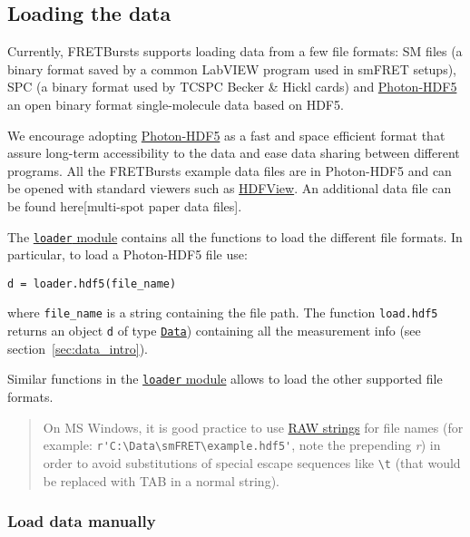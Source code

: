 \subsection{Loading the data}
Currently, FRETBursts supports loading data from a few file formats: SM files (a binary format saved by a common LabVIEW program used in smFRET setups), SPC (a binary format used by TCSPC Becker \& Hickl cards) and \href{http://photon-hdf5.readthedocs.org/}{Photon-HDF5}  an open binary format single-molecule data based on HDF5.

We encourage adopting \href{http://photon-hdf5.readthedocs.org/}{Photon-HDF5} as a fast and space efficient format that assure long-term accessibility to the data and ease data sharing between different programs. All the FRETBursts example data files are in Photon-HDF5 and can be opened with standard viewers such as \href{http://www.hdfgroup.org/products/java/hdfview/}{HDFView}. An additional data file can be found here[multi-spot paper data files].

The \href{http://fretbursts.readthedocs.org/en/latest/loader.html}{\texttt{loader} module}
contains all the functions to load the different file formats. In particular, to load a Photon-HDF5 file use:

\begin{verbatim}
d = loader.hdf5(file_name)
\end{verbatim}

where \verb|file_name| is a string containing the file path. The function \verb|load.hdf5| returns an object \verb|d| of type \href{http://fretbursts.readthedocs.org/en/latest/data_class.html}{\texttt{Data}}) containing all the measurement info (see section~\ref{sec:data_intro}).

Similar functions in the \href{http://fretbursts.readthedocs.org/en/latest/loader.html}{\texttt{loader} module} allows to load the other supported file formats.

\begin{quote}
On MS Windows, it is good practice to use \href{https://docs.python.org/2/tutorial/introduction.html#strings}{RAW strings} for file names (for example: \verb|r'C:\Data\smFRET\example.hdf5'|, note the prepending \textit{r}) in order to avoid substitutions of special escape sequences like \verb|\t| (that would be replaced with TAB in a normal string).
\end{quote}

\subsubsection{Load data manually}

